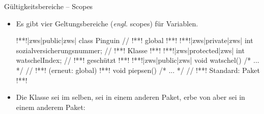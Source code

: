 \begin{frame}[fragile]{Gültigkeitsbereiche -- Scopes}
    \begin{itemize}[<+(1)->]
        \item Es gibt vier Geltungsbereiche (\textit{engl.} scopes) für Variablen.
\begin{plainjava}[language=xJava]
!**!|zws|public|zws| class Pinguin { // !**! global
!**!    !**!|zws|private|zws| int sozialversicherungsnummer; // !**! Klasse
!**!    !**!|zws|protected|zws| int watschelIndex; // !**! geschützt
!**!    !**!|zws|public|zws| void watschel() { /* ... */ } // !**! (erneut: global)
!**!    void piepsen() { /* ... */ } // !**! Standard: Paket
!**!}
\end{plainjava}
    \item<8-> Die Klasse  sei im selben,  sei in einem anderen Paket,  erbe von  aber sei in einem anderem Paket: \medskip\par
    \end{itemize}
\end{frame}

